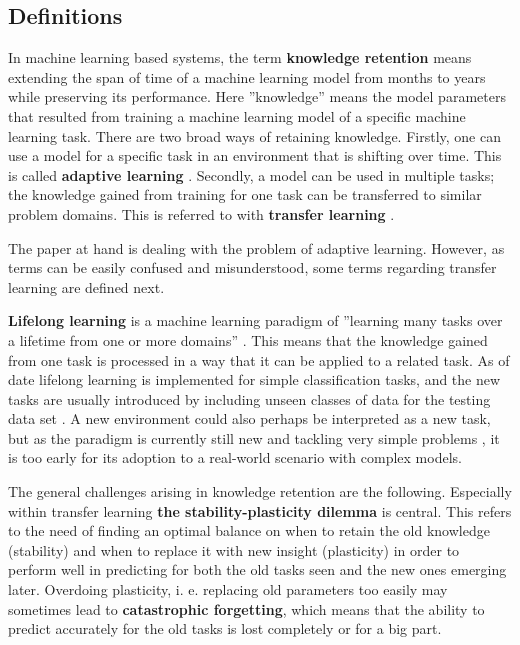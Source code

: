 
\subsection{Definitions}





In machine learning based systems, the term \textbf{knowledge retention} means extending the span of time of a machine learning model from months to years while preserving its performance. Here ''knowledge'' means the model parameters that resulted from training a machine learning model of a specific machine learning task. There are two broad ways of retaining knowledge. Firstly, one can use a model for a specific task in an environment that is shifting over time. This is called \textbf{adaptive learning} \cite{conceptdriftsurvey}. Secondly, a model can be used in multiple tasks; the knowledge gained from training for one task can be transferred to similar problem domains. This is referred to with \textbf{transfer learning} \cite{lmlsystems}.

The paper at hand is dealing with the problem of adaptive learning. However, as terms can be easily confused and misunderstood, some terms regarding transfer learning are defined next.

\textbf{Lifelong learning} is a machine learning paradigm of ''learning many tasks over a lifetime from one or more domains'' \cite{lmlsystems}. This means that the knowledge gained from one task is processed in a way that it can be applied to a related task. As of date lifelong learning is implemented for simple classification tasks, and the new tasks are usually introduced by including unseen classes of data for the testing data set \cite{lmlinneuralnets}. A new environment could also perhaps be interpreted as a new task, but as the paradigm is currently still new and tackling very simple problems \cite{lmlinneuralnets}, it is too early for its adoption to a real-world scenario with complex models.

The general challenges arising in knowledge retention are the following. Especially within transfer learning \textbf{the stability-plasticity dilemma} is central. This refers to the need of finding an optimal balance on when to retain the old knowledge (stability) and when to replace it with new insight (plasticity) in order to perform well in predicting for both the old tasks seen and the new ones emerging later. Overdoing plasticity, i. e. replacing old parameters too easily may sometimes lead to \textbf{catastrophic forgetting}, which means that the ability to predict accurately for the old tasks is lost completely or for a big part.

